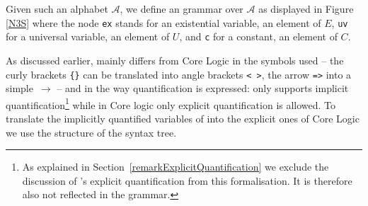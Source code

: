 Given such an \nthree alphabet $\mathcal{A}$, we define an \nthree grammar over $\mathcal{A}$ as displayed  
in Figure \ref{N3S}
where the node \texttt{ex} stands for an existential variable, \ie an element of $E$, \texttt{uv} for a universal variable, \ie an element of $U$, and \texttt{c} for a constant, \ie an 
element of $C$. 
%

As discussed earlier, \nthreelogic mainly differs from \nthree Core Logic in the symbols used --
the curly brackets \texttt{\{\}} can be translated 
into angle brackets \verb!< >!, the \nthree arrow \texttt{=>} into a simple~$\rightarrow$ -- 
%  
and in the way quantification is expressed: \nthreelogic only supports implicit quantification\footnote{As explained in Section~\ref{remarkExplicitQuantification} we exclude the discussion of 
\nthree's explicit quantification from this formalisation. It is therefore also not reflected in the grammar.} while in \nthree Core logic only explicit quantification 
is allowed. %
To translate the implicitly quantified variables of \nthree into the explicit ones of \nthree Core Logic we use 
the structure of the syntax tree. 


